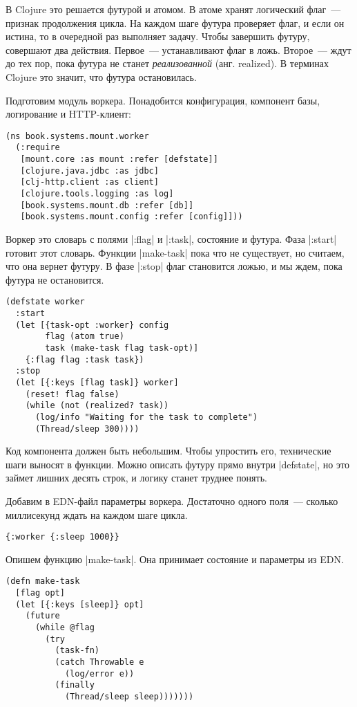 В Clojure это решается футурой и атомом. В атоме хранят логический флаг~---
признак продолжения цикла. На каждом шаге футура проверяет флаг, и если он
истина, то в очередной раз выполняет задачу. Чтобы завершить футуру, совершают
два действия. Первое~--- устанавливают флаг в ложь. Второе~--- ждут до тех пор,
пока футура не станет \emph{реализованной} (анг. realized). В терминах Clojure
это значит, что футура остановилась.

Подготовим модуль воркера. Понадобится конфигурация, компонент базы, логирование
и HTTP-клиент:

\begin{verbatim}
(ns book.systems.mount.worker
  (:require
   [mount.core :as mount :refer [defstate]]
   [clojure.java.jdbc :as jdbc]
   [clj-http.client :as client]
   [clojure.tools.logging :as log]
   [book.systems.mount.db :refer [db]]
   [book.systems.mount.config :refer [config]]))
\end{verbatim}

Воркер это словарь с полями \spverb|:flag| и \spverb|:task|, состояние и
футура. Фаза \spverb|:start| готовит этот словарь. Функции \spverb|make-task|
пока что не существует, но считаем, что она вернет футуру. В фазе \spverb|:stop|
флаг становится ложью, и мы ждем, пока футура не остановится.

\begin{verbatim}
(defstate worker
  :start
  (let [{task-opt :worker} config
        flag (atom true)
        task (make-task flag task-opt)]
    {:flag flag :task task})
  :stop
  (let [{:keys [flag task]} worker]
    (reset! flag false)
    (while (not (realized? task))
      (log/info "Waiting for the task to complete")
      (Thread/sleep 300))))
\end{verbatim}

Код компонента должен быть небольшим. Чтобы упростить его, технические шаги
выносят в функции. Можно описать футуру прямо внутри \spverb|defstate|, но это
займет лишних десять строк, и логику станет труднее понять.

Добавим в EDN-файл параметры воркера. Достаточно одного поля~--- сколько
миллисекунд ждать на каждом шаге цикла.

\begin{verbatim}
{:worker {:sleep 1000}}
\end{verbatim}

Опишем функцию \spverb|make-task|. Она принимает состояние и параметры из EDN.

\begin{verbatim}
(defn make-task
  [flag opt]
  (let [{:keys [sleep]} opt]
    (future
      (while @flag
        (try
          (task-fn)
          (catch Throwable e
            (log/error e))
          (finally
            (Thread/sleep sleep)))))))
\end{verbatim}


